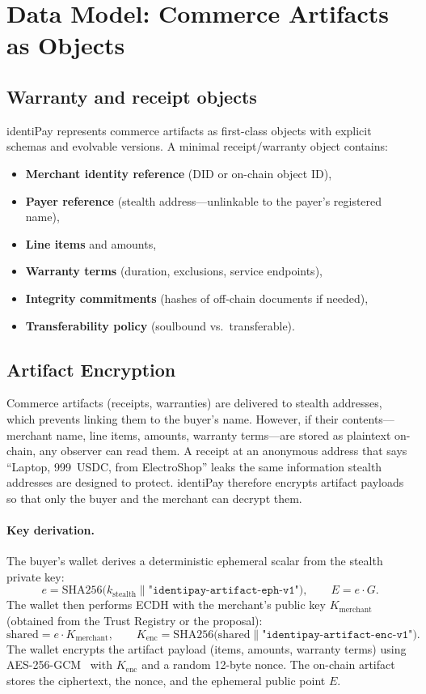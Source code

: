\documentclass[11pt]{article}
\begin{document}
\section{Data Model: Commerce Artifacts as Objects}
\subsection{Warranty and receipt objects}
identiPay represents commerce artifacts as first-class objects with explicit schemas and evolvable versions. A minimal receipt/warranty object contains:
\begin{itemize}
  \item \textbf{Merchant identity reference} (DID or on-chain object ID),
  \item \textbf{Payer reference} (stealth address---unlinkable to the payer's registered name),
  \item \textbf{Line items} and amounts,
  \item \textbf{Warranty terms} (duration, exclusions, service endpoints),
  \item \textbf{Integrity commitments} (hashes of off-chain documents if needed),
  \item \textbf{Transferability policy} (soulbound vs.\ transferable).
\end{itemize}

\subsection{Artifact Encryption}
Commerce artifacts (receipts, warranties) are delivered to stealth addresses, which prevents linking them to the buyer's name. However, if their contents---merchant name, line items, amounts, warranty terms---are stored as plaintext on-chain, any observer can read them. A receipt at an anonymous address that says ``Laptop, 999~USDC, from ElectroShop'' leaks the same information stealth addresses are designed to protect. identiPay therefore encrypts artifact payloads so that only the buyer and the merchant can decrypt them.

\paragraph{Key derivation.}
The buyer's wallet derives a deterministic ephemeral scalar from the stealth private key:
$$
e = \mathrm{SHA256}\big(k_{\mathrm{stealth}} \parallel \texttt{"identipay-artifact-eph-v1"}\big), \qquad E = e \cdot G.
$$
The wallet then performs ECDH with the merchant's public key $K_{\mathrm{merchant}}$ (obtained from the Trust Registry or the proposal):
$$
\mathrm{shared} = e \cdot K_{\mathrm{merchant}}, \qquad K_{\mathrm{enc}} = \mathrm{SHA256}\big(\mathrm{shared} \parallel \texttt{"identipay-artifact-enc-v1"}\big).
$$
The wallet encrypts the artifact payload (items, amounts, warranty terms) using AES-256-GCM~\cite{gcm} with $K_{\mathrm{enc}}$ and a random 12-byte nonce. The on-chain artifact stores the ciphertext, the nonce, and the ephemeral public point $E$.
\end{document}
